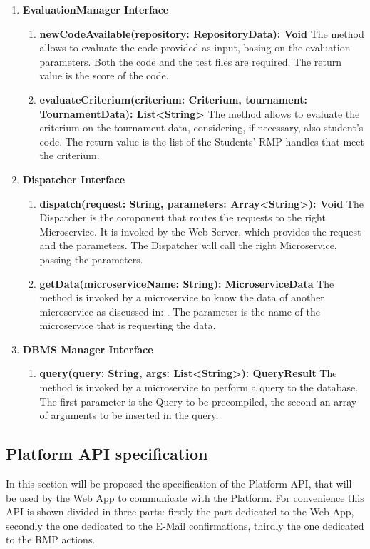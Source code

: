 \begin{enumerate}
\begin{enumerate}[label=$\bullet$]
        \end{enumerate}
    \item \textbf{EvaluationManager Interface}
        \begin{enumerate}[label=$\bullet$]
            \item \textbf{newCodeAvailable(repository: RepositoryData): Void} The method allows to evaluate the code provided as input, basing on the evaluation parameters. Both the code and the test files are
            required. The return value is the score of the code.
            \item \textbf{evaluateCriterium(criterium: Criterium, tournament: TournamentData): List<String>} The method allows to evaluate the criterium on the tournament data, considering, if necessary, also student's code. The return value is the list of the Students' RMP handles that meet the criterium.
        \end{enumerate}
    \item \textbf{Dispatcher Interface}
        \begin{enumerate}[label=$\bullet$]
            \item \textbf{dispatch(request: String, parameters: Array<String>): Void} The Dispatcher is the component that routes the requests to the right Microservice. It is invoked by the Web Server, which provides the request and the 
            parameters. The Dispatcher will call the right Microservice, passing the parameters.
            \item \textbf{getData(microserviceName: String): MicroserviceData} \label{meth:dispGetData}The method is invoked by a microservice to know the data of another microservice as discussed in: . The parameter is the name of the microservice that is requesting the data.
        \end{enumerate}
    \item \textbf{DBMS Manager Interface}
        \begin{enumerate} [label=$\bullet$]
            \item \textbf{query(query: String, args: List<String>): QueryResult} The method is invoked by a microservice to perform a query to the database. The first parameter is the Query to be precompiled, the second an array of arguments to be inserted in the query.
    \end{enumerate}
\end{enumerate}
\subsection{Platform API specification}
In this section will be proposed the specification of the Platform API, that will be used by the Web App to communicate with the Platform.
For convenience this API is shown divided in three parts: firstly the part dedicated to the Web App, secondly the one dedicated to the E-Mail confirmations, thirdly the one dedicated to the RMP actions.
